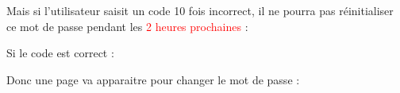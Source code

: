 \documentclass{article}
\begin{document}
\begin{enumerate}
              
 \vspace{0.4cm}

Mais si l'utilisateur saisit un code 10 fois incorrect, il ne pourra pas réinitialiser ce mot de passe pendant les  \textcolor{red}{2 heures prochaines} :
 
\vspace{0.4cm}
\hspace*{-0.7in}
               \noindent{} 
 
 
 
 
               
Si le code est correct :


\vspace{0.4cm}
\hspace*{-0.7in}
               \noindent{}

\newpage
Donc une page va apparaitre pour changer le mot de passe :



\end{enumerate}
\end{document}
